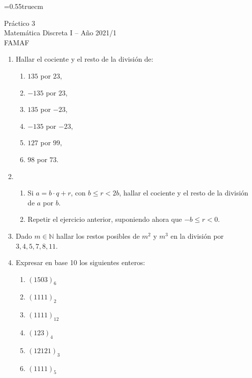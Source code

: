 \documentclass[a4paper,12pt,twoside,spanish,reqno]{amsbook}
\numberwithin{equation}{section}
\begin{document}
    \baselineskip=0.55truecm %
    

  {\bf \begin{center}\large  Práctico 3 \\ Matemática Discreta I -- Año 2021/1 \\ FAMAF \end{center}}



\begin{enumerate}
\setlength\itemsep{1.1em}


\item Hallar el cociente y el resto de la división de:

\begin{multicols}{3}
\begin{enumerate}
  \item $135$ por $23$,
    \item $-135$ por $23$,
    \item $135$ por $-23$,
  \item $-135$ por $-23$,
    \item $127$ por $99$,
    \item $98$ por $73$.
\end{enumerate}
\end{multicols}


\item 
\begin{enumerate}
  \item Si $a=b\cdot q+r$, con $b \le r <2 b$, hallar el cociente y el resto de la división de $a$ por $b$.
  \item Repetir el ejercicio anterior, suponiendo ahora que $-b \le r < 0$.
\end{enumerate}


\item Dado $m\in \mathbb N$ hallar los restos posibles de $m^2$ y $m^3$ en la división por $3,4,5,7,8, 11$.

\item Expresar en base 10 los siguientes enteros:
\begin{multicols}{3}
\begin{enumerate}
    \item $(1503)_6$ 
    \item $(1111)_2$ 
    \item $(1111)_{12}$
    \item $(123)_4$ 
    \item $(12121)_3$
    \item $(1111)_5$
\end{enumerate}
\end{multicols}



\end{enumerate}
\end{document}
